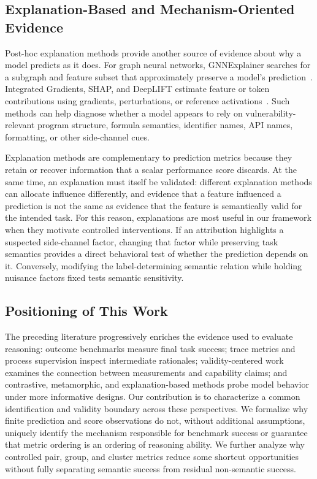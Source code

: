 \documentclass[acmsmall,screen,review,anonymous]{acmart}
\begin{document}
\subsection{Explanation-Based and Mechanism-Oriented Evidence}
\label{sec:rw-explanation}

Post-hoc explanation methods provide another source of evidence about why a
model predicts as it does. For graph neural networks, GNNExplainer searches
for a subgraph and feature subset that approximately preserve a model's
prediction~\cite{Ying2019GNNExplainer}. Integrated Gradients, SHAP, and
DeepLIFT estimate feature or token contributions using gradients,
perturbations, or reference activations~\cite{Sundararajan2017IG,
LundbergLee2017SHAP,Shrikumar2017DeepLIFT}. Such methods can help diagnose
whether a model appears to rely on vulnerability-relevant program structure,
formula semantics, identifier names, API names, formatting, or other
side-channel cues.

Explanation methods are complementary to prediction metrics because they
retain or recover information that a scalar performance score discards. At
the same time, an explanation must itself be validated: different explanation
methods can allocate influence differently, and evidence that a feature
influenced a prediction is not the same as evidence that the feature is
semantically valid for the intended task. For this reason, explanations are
most useful in our framework when they motivate controlled interventions. If
an attribution highlights a suspected side-channel factor, changing that
factor while preserving task semantics provides a direct behavioral test of
whether the prediction depends on it. Conversely, modifying the
label-determining semantic relation while holding nuisance factors fixed tests
semantic sensitivity.


\subsection{Positioning of This Work}
\label{sec:rw-positioning}

The preceding literature progressively enriches the evidence used to evaluate
reasoning: outcome benchmarks measure final task success; trace metrics and
process supervision inspect intermediate rationales; validity-centered work
examines the connection between measurements and capability claims; and
contrastive, metamorphic, and explanation-based methods probe model behavior
under more informative designs. Our contribution is to characterize a common
identification and validity boundary across these perspectives. We formalize
why finite prediction and score observations do not, without additional
assumptions, uniquely identify the mechanism responsible for benchmark
success or guarantee that metric ordering is an ordering of reasoning
ability. We further analyze why controlled pair, group, and cluster metrics
reduce some shortcut opportunities without fully separating semantic success
from residual non-semantic success.
\end{document}
